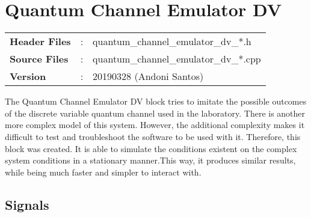 \clearpage
\graphicspath{{./lib/quantum_channel_emulator_dv/figures/}}
\section{Quantum Channel Emulator DV}

\begin{tcolorbox}	
	\begin{tabular}{p{2.75cm} p{0.2cm} p{10.5cm}} 	
        \textbf{Header Files}    &:& quantum\_channel\_emulator\_dv\_*.h \\
		\textbf{Source Files}    &:& quantum\_channel\_emulator\_dv\_*.cpp \\
        \textbf{Version}        &:& 20190328 (Andoni Santos)
	\end{tabular}
\end{tcolorbox}

\maketitle
The Quantum Channel Emulator DV block tries to imitate the possible outcomes
of the discrete variable quantum channel used in the laboratory.
There is another more complex model of this system. However, the additional
complexity makes it difficult to test and troubleshoot the software to be used
with it. Therefore, this block was created. It is able to simulate the
conditions existent on the complex system conditions in a stationary manner.This
way, it produces similar results, while being much faster and simpler to
interact with.


\subsection*{Signals}

